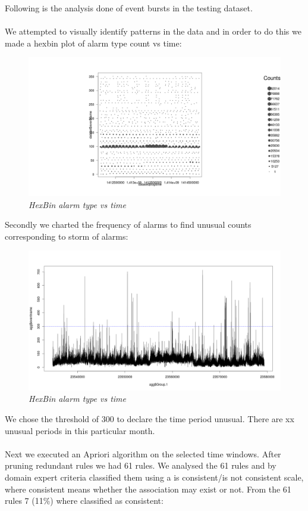 \documentclass[10pt,a4paper]{article}
\begin{document}
Following is the analysis done of event bursts in the testing dataset.
\\\\
We attempted to visually identify patterns in the data and in order to do this we made a hexbin plot of alarm type count vs time:

\begin{figure}[H]
 \includegraphics[scale=0.5]{eventHexBin.png}
  \centering
  \caption{\textit{HexBin alarm type vs time }}
  \label{fig:AlarmHexBin}
\end{figure}	

Secondly we charted the frequency of alarms to find unusual counts corresponding to storm of alarms:

\begin{figure}[H]
 \includegraphics[scale=0.5]{eventBurst.png}
  \centering
  \caption{\textit{HexBin alarm type vs time }}
  \label{fig:EventBurst}
\end{figure}	

We chose the threshold of 300 to declare the time period unusual. There are xx unusual periods in this particular month.
\\\\
Next we executed an Apriori algorithm on the selected time windows. After pruning redundant rules we had 61 rules. We analysed the 61 rules and by domain expert criteria classified them using a is consistent/is not consistent scale, where consistent means whether the association may exist or not. From the 61 rules 7 (11\%) where classified as consistent:
\end{document}
